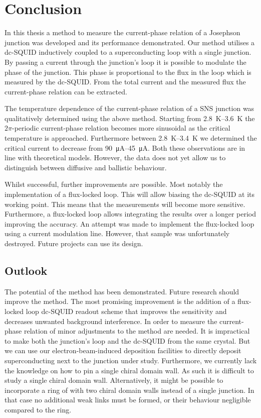 \chapter{Conclusion}
In this thesis a method to measure the current-phase relation of a Josephson junction was developed and its performance demonstrated. Our method utilises a dc-SQUID inductively coupled to a superconducting loop with a single junction. By passing a current through the junction's loop it is possible to modulate the phase of the junction. This phase is proportional to the flux in the loop which is measured by the dc-SQUID. From the total current and the measured flux the current-phase relation can be extracted.

The temperature dependence of the current-phase relation of a SNS junction was qualitatively determined using the above method. Starting from \qtyrange{2.8}{3.6}{\kelvin} the $2\pi$-periodic current-phase relation becomes more sinusoidal as the critical temperature is approached. Furthermore between \qtyrange{2.8}{3.4}{\kelvin} we determined the critical current to decrease from \qtyrange{90}{45}{\micro\ampere}. Both these observations are in line with theoretical models. However, the data does not yet allow us to distinguish between diffusive and ballistic behaviour.

Whilst successful, further improvements are possible. Most notably the implementation of a flux-locked loop. This will allow biasing the dc-SQUID at its working point. This means that the measurements will become more sensitive. Furthermore, a flux-locked loop allows integrating the results over a longer period improving the accuracy. An attempt was made to implement the flux-locked loop using a current modulation line. However, that sample was unfortunately destroyed. Future projects can use its design.

\section{Outlook}
The potential of the method has been demonstrated. Future research should improve the method. The most promising improvement is the addition of a flux-locked loop dc-SQUID readout scheme that improves the sensitivity and decreases unwanted background interference.  In order to measure the current-phase relation of  minor adjustments to the method are needed. It is impractical to make both the junction's loop and the dc-SQUID from the same crystal. But we can use our electron-beam-induced deposition facilities to directly deposit superconducting  next to the junction under study. Furthermore, we currently lack the knowledge on how to pin a single chiral domain wall. As such it is difficult to study a single chiral domain wall. Alternatively, it might be possible to incorporate a ring of  with two chiral domain walls instead of a single junction. In that case no additional weak links must be formed, or their behaviour negligible compared to the  ring.